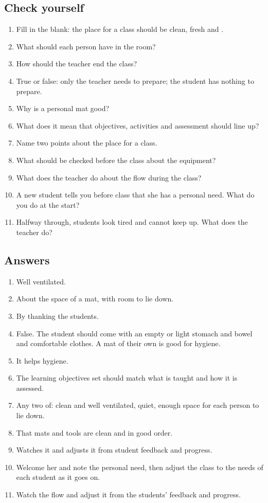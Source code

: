 \subsection*{Check yourself}

\begin{enumerate}
\item Fill in the blank: the place for a class should be clean, fresh and \underline{\hspace{2cm}}.
\item What should each person have in the room?
\item How should the teacher end the class?
\item True or false: only the teacher needs to prepare; the student has nothing to prepare.
\item Why is a personal mat good?
\item What does it mean that objectives, activities and assessment should line up?
\item Name two points about the place for a class.
\item What should be checked before the class about the equipment?
\item What does the teacher do about the flow during the class?
\item A new student tells you before class that she has a personal need. What do you do at the start?
\item Halfway through, students look tired and cannot keep up. What does the teacher do?
\end{enumerate}

\subsection*{Answers}

\begin{enumerate}
\item Well ventilated.
\item About the space of a mat, with room to lie down.
\item By thanking the students.
\item False. The student should come with an empty or light stomach and bowel and comfortable clothes. A mat of their own is good for hygiene.
\item It helps hygiene.
\item The learning objectives set should match what is taught and how it is assessed.
\item Any two of: clean and well ventilated, quiet, enough space for each person to lie down.
\item That mats and tools are clean and in good order.
\item Watches it and adjusts it from student feedback and progress.
\item Welcome her and note the personal need, then adjust the class to the needs of each student as it goes on.
\item Watch the flow and adjust it from the students' feedback and progress.
\end{enumerate}

